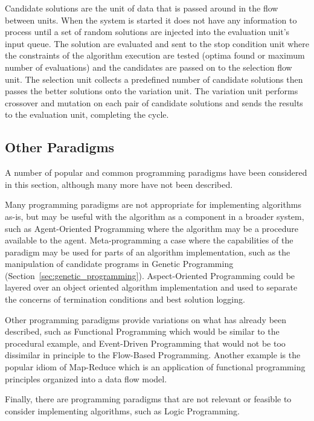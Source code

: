 Candidate solutions are the unit of data that is passed around in the flow between units.
When the system is started it does not have any information to process until a set of random solutions are injected into the evaluation unit's input queue. The solution are evaluated and sent to the stop condition unit where the constraints of the algorithm execution are tested (optima found or maximum number of evaluations) and the candidates are passed on to the selection flow unit. The selection unit collects a predefined number of candidate solutions then passes the better solutions onto the variation unit. The variation unit performs crossover and mutation on each pair of candidate solutions and sends the results to the evaluation unit, completing the cycle.



% 
% 
\subsection{Other Paradigms}
\label{sec:other}
A number of popular and common programming paradigms have been considered in this section, although many more have not been described. 

Many programming paradigms are not appropriate for implementing algorithms as-is, but may be useful with the algorithm as a component in a broader system, such as Agent-Oriented Programming where the algorithm may be a procedure available to the agent. Meta-programming a case where the capabilities of the paradigm may be used for parts of an algorithm implementation, such as the manipulation of candidate programs in Genetic Programming (Section~\ref{sec:genetic_programming}). Aspect-Oriented Programming could be layered over an object oriented algorithm implementation and used to separate the concerns of termination conditions and best solution logging.

Other programming paradigms provide variations on what has already been described, such as Functional Programming which would be similar to the procedural example, and Event-Driven Programming that would not be too dissimilar in principle to the Flow-Based Programming. Another example is the popular idiom of Map-Reduce which is an application of functional programming principles organized into a data flow model.

Finally, there are programming paradigms that are not relevant or feasible to consider implementing algorithms, such as Logic Programming.

